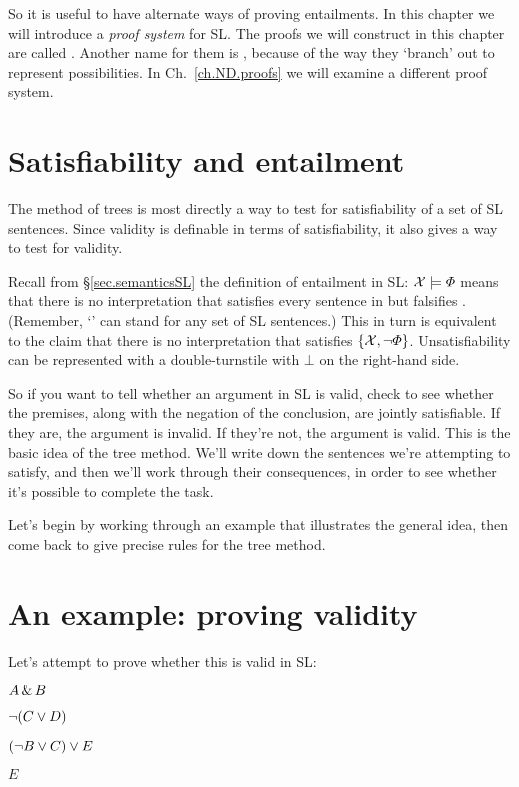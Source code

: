 So it is useful to have alternate ways of proving entailments. In this chapter we will introduce a \emph{proof system} for SL. The proofs we will construct in this chapter are called . Another name for them is , because of the way they `branch' out to represent possibilities. In Ch.\ \ref{ch.ND.proofs} we will examine a different proof system.

\section{Satisfiability and entailment}

The method of trees is most directly a way to test for satisfiability of a set of SL sentences. Since validity is definable in terms of satisfiability, it also gives a way to test for validity.

Recall from \S\ref{sec.semanticsSL} the definition of entailment in SL: $\mathcal{X}{}\models\varPhi{}$ means that there is no interpretation that satisfies every sentence in \metaSetX{} but falsifies \metaA{}. (Remember, `\metaSetX{}' can stand for any set of SL sentences.) This in turn is equivalent to the claim that there is no interpretation that satisfies $\{\mathcal{X}{},\neg\varPhi{}\}$. Unsatisfiability can be represented with a double-turnstile with $\bot$ on the right-hand side.


So if you want to tell whether an argument in SL is valid, check to see whether the premises, along with the negation of the conclusion, are jointly satisfiable. If they are, the argument is invalid. If they're not, the argument is valid. This is the basic idea of the tree method. We'll write down the sentences we're attempting to satisfy, and then we'll work through their consequences, in order to see whether it's possible to complete the task.

Let's begin by working through an example that illustrates the general idea, then come back to give precise rules for the tree method.

\section{An example: proving validity}

Let's attempt to prove whether this is valid in SL:

\begin{earg}
\item[] $A\,\&\, B$
\item[] $\neg(C\vee D)$
\item[] $(\neg B \vee C) \vee E$
\item[\therefore] $E$
\end{earg}

